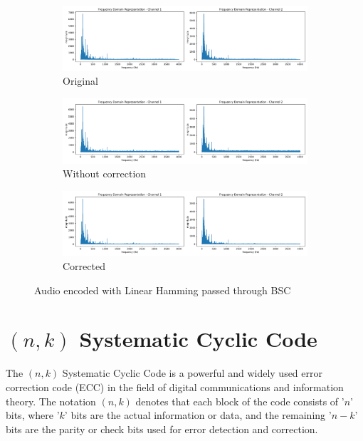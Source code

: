 \documentclass{article}
\begin{document}
\begin{figure}[htb]
    \centering
    \begin{subfigure}[b]{\textwidth}
        \centering
        \includegraphics[width=\textwidth]{../Result/Linear/wav-frequency-domain-TX.png}
        \caption{Original}
        \label{fig:f-audio-linear-bsc-original}
    \end{subfigure}
    \begin{subfigure}[b]{\textwidth}
        \centering
        \includegraphics[width=\textwidth]{../Result/Linear/linear-bsc-wav-frequency-domain-RX.png}
        \caption{Without correction}
        \label{fig:f-audio-linear-bsc-no-correction}
    \end{subfigure}
    \begin{subfigure}[b]{\textwidth}
        \centering
        \includegraphics[width=\textwidth]{../Result/Linear/linear-bsc-wav-frequency-domain-RX-syndrome-corrected.png}
        \caption{Corrected}
        \label{fig:f-audio-linear-bsc-syndrome-corrected}
    \end{subfigure}
       \caption{Audio encoded with Linear Hamming passed through BSC}
       \label{fig:f-audio-linear-bsc}
\end{figure}


\section{$(n,k)$ Systematic Cyclic Code}
The $(n,k)$ Systematic Cyclic Code is a powerful and widely used error correction code (ECC) in the field of digital communications and information theory. The notation $(n,k)$ denotes that each block of the code consists of '$n$' bits, where '$k$' bits are the actual information or data, and the remaining '$n-k$' bits are the parity or check bits used for error detection and correction.
\end{document}
